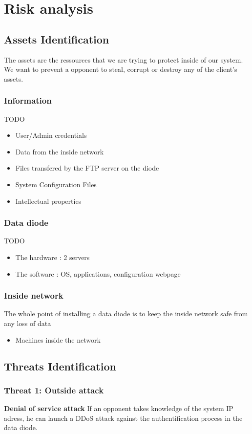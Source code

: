 \documentclass[a4paper,11pt]{article}
\begin{document}
\section{Risk analysis}
\subsection{Assets Identification}
The assets are the ressources that we are trying to protect inside of our system. We want to prevent a opponent to steal, corrupt or destroy any of the client's assets.
\subsubsection{Information}
TODO
\begin{itemize}
\item User/Admin credentials
\item Data from the inside network
\item Files transfered by the FTP server on the diode
\item System Configuration Files
\item Intellectual properties
\end{itemize}

\subsubsection{Data diode}
TODO
\begin{itemize}
\item The hardware : 2 servers
\item The software : OS, applications, configuration webpage
\end{itemize}
\subsubsection{Inside network}
The whole point of installing a data diode is to keep the inside network safe from any loss of data
\begin{itemize}
\item Machines inside the network
\end{itemize}
\subsection{Threats Identification}

\subsubsection{Threat 1: Outside attack}
\textbf{Denial of service attack} If an opponent takes knowledge of the system IP adress, he can launch a DDoS attack against the authentification process in the data diode.  \\
\end{document}
